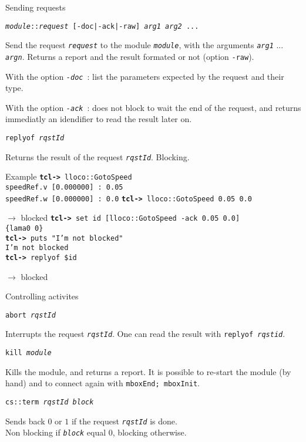 \documentclass[a4paper,landscape,smooth]{show}
\begin{document}
\begin{tslide}{Sending requests}
   \vfill
   \begin{cartouche}
      \tt {\em module}::{\em request} [-doc|-ack|-raw] {\em arg1} {\em arg2} ...
   \end{cartouche}
   Send the request {\tt\em request} to the module {\tt\em module}, with the
   arguments {\tt\em arg1} ... {\tt\em argn}. Returns a report and the
   result formated or not (option {\tt -raw}).

   With the option {\tt\em -doc}~: list the parameters expected by the
   request and their type.

   With the option {\tt\em -ack}~: does not block to wait the end of
   the request, and returns immediatly an idendifier to read the result
   later on.

   \vfill
   \begin{cartouche}
      \tt replyof {\em rqstId}
   \end{cartouche}
   Returns the result of the request {\tt\em rqstId}. Blocking.
   \vfill
\end{tslide}


\begin{tslide}{Example}
   \vfill
   {\tt {\bf tcl->} lloco::GotoSpeed\\
   speedRef.v [0.000000] : 0.05\\
   speedRef.w [0.000000] : 0.0}
   \vfill
   {\tt {\bf tcl->} lloco::GotoSpeed 0.05 0.0}

   $\rightarrow$ blocked
   \vfill
   {\tt {\bf tcl->} set id [lloco::GotoSpeed -ack 0.05 0.0]\\
	\{lama0 0\}\\
	{\bf tcl->} puts "I'm not blocked"\\
	I'm not blocked\\
	{\bf tcl->} replyof \$id}

   $\rightarrow$ blocked
   \vfill
\end{tslide}


\begin{tslide}{Controlling activites}
   \vfill
   \begin{cartouche}
      \tt abort {\em rqstId}
   \end{cartouche}
   Interrupts the request {\tt\em rqstId}. One can read the result with
   {\tt replyof \em rqstid}.
   \vfill
   \begin{cartouche}
      \tt kill {\em module}
   \end{cartouche}
   Kills the module, and returns a report. It is possible to re-start the
   module (by hand) and to connect again with {\tt mboxEnd; mboxInit}.
   \vfill
   \begin{cartouche}
      \tt cs::term {\em rqstId} {\em block}
   \end{cartouche}
   Sends back $0$ or $1$ if the request {\tt\em rqstId} is done. \\
   Non blocking if {\tt\em block} equal 0, blocking otherwise.
   \vfill
\end{tslide}
\end{document}

